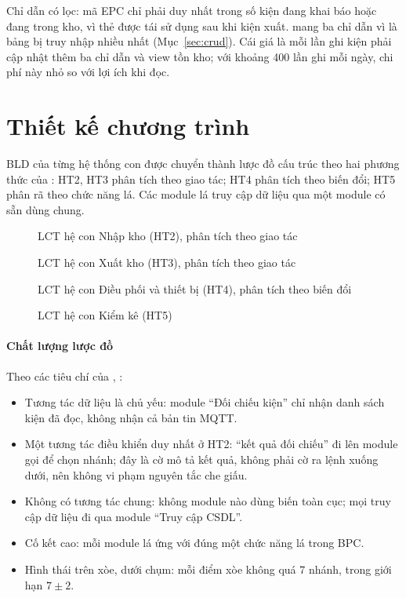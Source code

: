 Chỉ dẫn  có lọc: mã EPC chỉ phải duy nhất trong số kiện đang khai báo hoặc đang trong kho, vì thẻ được tái sử dụng sau khi kiện xuất.  mang ba chỉ dẫn vì là bảng bị truy nhập nhiều nhất (Mục~\ref{sec:crud}). Cái giá là mỗi lần ghi kiện phải cập nhật thêm ba chỉ dẫn và view tồn kho; với khoảng 400 lần ghi mỗi ngày, chi phí này nhỏ so với lợi ích khi đọc.

\section{Thiết kế chương trình}
\label{sec:chuongtrinh}

BLD của từng hệ thống con được chuyển thành lược đồ cấu trúc theo hai phương thức của \cite[Ch.~10]{tung_qlhttt}: HT2, HT3 phân tích theo giao tác; HT4 phân tích theo biến đổi; HT5 phân rã theo chức năng lá. Các module lá truy cập dữ liệu qua một module có sẵn dùng chung.

\begin{figure}[H]
\centering
{}
\caption{LCT hệ con Nhập kho (HT2), phân tích theo giao tác}
\label{fig:lctht2}
\end{figure}

\begin{figure}[H]
\centering
{}
\caption{LCT hệ con Xuất kho (HT3), phân tích theo giao tác}
\label{fig:lctht3}
\end{figure}

\begin{figure}[H]
\centering
{}
\caption{LCT hệ con Điều phối và thiết bị (HT4), phân tích theo biến đổi}
\label{fig:lctht4}
\end{figure}

\begin{figure}[H]
\centering
{}
\caption{LCT hệ con Kiểm kê (HT5)}
\label{fig:lctht5}
\end{figure}

\paragraph{Chất lượng lược đồ} Theo các tiêu chí của \cite[Ch.~10]{tung_qlhttt}, \cite{yourdon1979}:
\begin{itemize}
  \item Tương tác dữ liệu là chủ yếu: module “Đối chiếu kiện” chỉ nhận danh sách kiện đã đọc, không nhận cả bản tin MQTT.
  \item Một tương tác điều khiển duy nhất ở HT2: “kết quả đối chiếu” đi lên module gọi để chọn nhánh; đây là cờ mô tả kết quả, không phải cờ ra lệnh xuống dưới, nên không vi phạm nguyên tắc che giấu.
  \item Không có tương tác chung: không module nào dùng biến toàn cục; mọi truy cập dữ liệu đi qua module “Truy cập CSDL”.
  \item Cố kết cao: mỗi module lá ứng với đúng một chức năng lá trong BPC.
  \item Hình thái trên xòe, dưới chụm: mỗi điểm xòe không quá 7 nhánh, trong giới hạn $7 \pm 2$.
\end{itemize}

